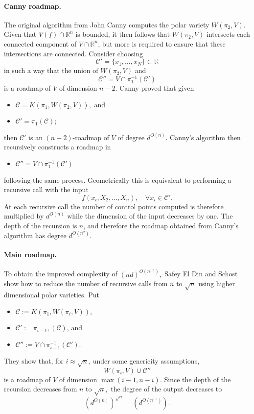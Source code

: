 \documentclass[12pt]{article}
\begin{document}
\paragraph*{Canny roadmap.}The original algorithm from John Canny \cite{canny1988complexity} computes the polar variety $W(\pi_2,V)$. Given that  $V(f) \cap \mathbb{R}^n$ is bounded, it then follows that $W(\pi_2,V)$ intersects each connected component of $V \cap \mathbb{R}^n$, but more is required to ensure that these intersections are connected.  Consider choosing
\[\mathscr{C}' = \{ x_1, \dots, x_N \} \subset \mathbb{R}\] in such a way that the union of $W(\pi_2,V)$ and 
\[
\mathscr{C}'' = V \cap \pi_1^{-1}(\mathscr{C}')
\]
is a roadmap of $V$ of dimension $n - 2$. Canny proved that given 
\begin{itemize}
    \item $\mathscr{C} = K(\pi_1, W(\pi_2,V)),$ and
    \item $\mathscr{C}' = \pi_1(\mathscr{C});$
\end{itemize}
then $\mathscr{C}'$ is an $(n - 2)$-roadmap of $V$ of degree $d^{O(n)}$. Canny's algorithm then recursively constructs a roadmap in 
\begin{itemize}
    \item $\mathscr{C}'' = V \cap \pi_1^{-1}(\mathscr{C}')$
\end{itemize}
following the same process. Geometrically this is equivalent to performing a recursive call with the input \[f(x_i, X_2, \dots, X_n), \quad \forall x_i \in \mathscr{C}'.\]  
At each recursive call the number of control points computed is therefore multiplied by $d^{O(n)}$ while the dimension of the input decreases by one. The depth of the recursion is $n$, and therefore the roadmap obtained from Canny's algorithm has degree $d^{O(n^2)}.$



\paragraph*{Main roadmap.}
To obtain the improved complexity of $(nd)^{O(n^{1.5})},$ Safey El Din and Schost show how to reduce the number of recursive calls from $n$ to $\sqrt{n}$ using higher dimensional polar varieties. Put
\begin{itemize}
    \item $\mathscr{C} := K(\pi_1, W(\pi_i,V))$, 
    \item $\mathscr{C}' := \pi_{i-1},(\mathscr{C})$, and 
    \item $\mathscr{C}'' := V \cap \pi_{i-1}^{-1}(\mathscr{C}')$.
\end{itemize}
They show that, for $i\approx \sqrt{n}$, under some genericity assumptions,
\[
W(\pi_i,V) \cup \mathscr{C}''
\]
is a roadmap of $V$ of dimension $\max(i - 1, n - i)$. Since the depth of the recursion decreases from $n$ to $\sqrt{n},$ the degree of the output decreases to \[(d^{O(n)})^{\sqrt{n}} = (d^{O(n^{1.5})}).\] 
\end{document}
